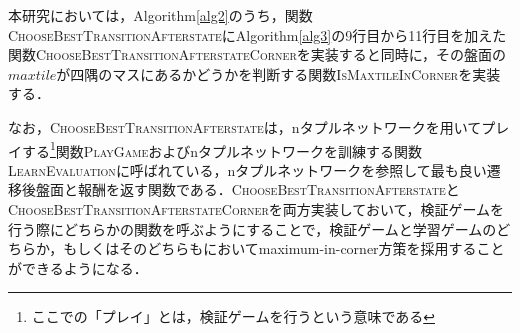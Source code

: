 \documentclass{suribt}
\begin{document}
本研究においては，Algorithm\ref{alg2}のうち，関数\textsc{ChooseBestTransitionAfterstate}にAlgorithm\ref{alg3}の9行目から11行目を加えた関数\textsc{ChooseBestTransitionAfterstateCorner}を実装すると同時に，その盤面の$maxtile$が四隅のマスにあるかどうかを判断する関数\textsc{IsMaxtileInCorner}を実装する．

なお，\textsc{ChooseBestTransitionAfterstate}は，nタプルネットワークを用いてプレイする\footnote{ここでの「プレイ」とは，検証ゲームを行うという意味である}関数\textsc{PlayGame}およびnタプルネットワークを訓練する関数\textsc{LearnEvaluation}に呼ばれている，nタプルネットワークを参照して最も良い遷移後盤面と報酬を返す関数である．\textsc{ChooseBestTransitionAfterstate}と\textsc{ChooseBestTransitionAfterstateCorner}を両方実装しておいて，検証ゲームを行う際にどちらかの関数を呼ぶようにすることで，検証ゲームと学習ゲームのどちらか，もしくはそのどちらもにおいてmaximum-in-corner方策を採用することができるようになる．

\medskip
\end{document}
